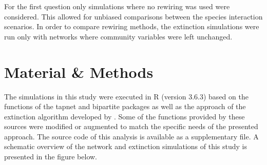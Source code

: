 \documentclass[12pt,a4paper]{article}
\begin{document}
For the first question only simulations where no rewiring was used were considered. This allowed for unbiased comparisons between the species interaction scenarios. In order to compare rewiring methods, the extinction simulations were run only with networks where community variables were left unchanged.



%	



	\section{Material \& Methods}
	The simulations in this study were executed in R \parencite{RCT2020} (version 3.6.3) based on the functions of the tapnet \parencite{Benadi2022} and bipartite \parencite{Dormann2008} packages as well as the approach of the extinction algorithm developed by \citeauthor{Vizentin-Bugoni2019} \parencite{Vizentin-Bugoni2019}. Some of the functions provided by these sources were modified or augmented to match the specific needs of the presented approach. The source code of this analysis is available as a supplementary file. A schematic overview of the network and extinction simulations of this study is presented in the figure below.	
	
\end{document}
